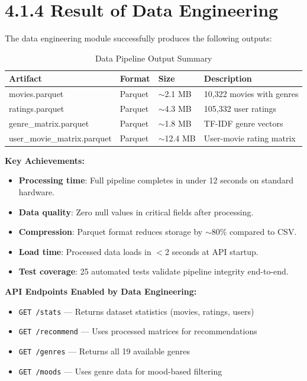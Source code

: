 \documentclass[12pt,a4paper]{report}
\begin{document}
\section{4.1.4 Result of Data Engineering}

The data engineering module successfully produces the following outputs:

\begin{table}[H]
\centering
\caption{Data Pipeline Output Summary}
\begin{tabular}{|l|l|l|l|}
\hline
\textbf{Artifact} & \textbf{Format} & \textbf{Size} & \textbf{Description} \\
\hline
movies.parquet & Parquet & $\sim$2.1 MB & 10,322 movies with genres \\
ratings.parquet & Parquet & $\sim$4.3 MB & 105,332 user ratings \\
genre\_matrix.parquet & Parquet & $\sim$1.8 MB & TF-IDF genre vectors \\
user\_movie\_matrix.parquet & Parquet & $\sim$12.4 MB & User-movie rating matrix \\
\hline
\end{tabular}
\end{table}

\textbf{Key Achievements:}
\begin{itemize}
    \item \textbf{Processing time}: Full pipeline completes in under 12 seconds on standard hardware.
    \item \textbf{Data quality}: Zero null values in critical fields after processing.
    \item \textbf{Compression}: Parquet format reduces storage by $\sim$80\% compared to CSV.
    \item \textbf{Load time}: Processed data loads in $<$2 seconds at API startup.
    \item \textbf{Test coverage}: 25 automated tests validate pipeline integrity end-to-end.
\end{itemize}

\textbf{API Endpoints Enabled by Data Engineering:}
\begin{itemize}
    \item \texttt{GET /stats} --- Returns dataset statistics (movies, ratings, users)
    \item \texttt{GET /recommend} --- Uses processed matrices for recommendations
    \item \texttt{GET /genres} --- Returns all 19 available genres
    \item \texttt{GET /moods} --- Uses genre data for mood-based filtering
\end{itemize}
\end{document}
